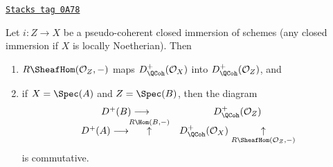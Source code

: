 \begin{lemma}
\label{duality-lemma-sheaf-with-exact-support-quasi-coherent}
\href{https://stacks.math.columbia.edu/tag/0A78}{\texttt{Stacks tag 0A78}}

Let $i : Z \to X$ be a pseudo-coherent closed immersion of schemes
(any closed immersion if $X$ is locally Noetherian).
Then
\begin{enumerate}
\item $R\SheafHom(\mathcal{O}_Z, -)$ maps $D^+_\QCoh(\mathcal{O}_X)$
into $D^+_\QCoh(\mathcal{O}_Z)$, and
\item if $X = \Spec(A)$ and $Z = \Spec(B)$, then the diagram
$$
\begin{array}{cc}D^+(B) \longrightarrow & D_\QCoh^+(\mathcal{O}_Z) \\ D^+(A) \longrightarrow\overset{R\Hom(B, -)}{\uparrow} & D_\QCoh^+(\mathcal{O}_X) \underset{R\SheafHom(\mathcal{O}_Z, -)}{\uparrow}\end{array}
$$
is commutative.
\end{enumerate}
\end{lemma}

